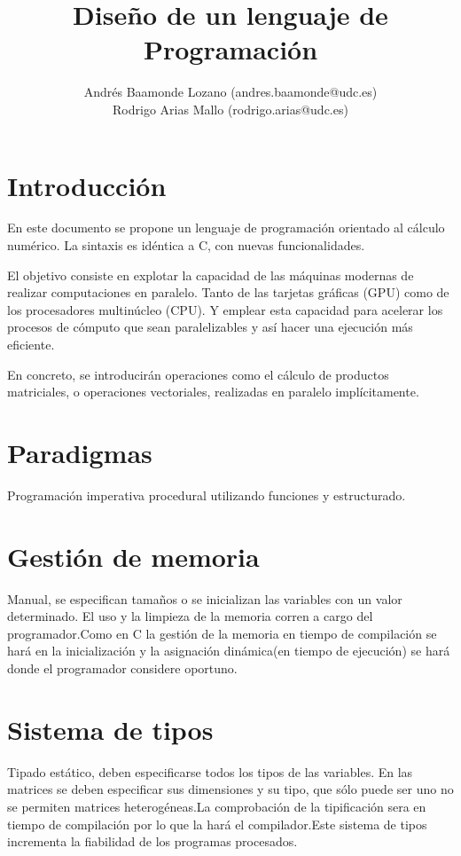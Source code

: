 \documentclass[12pt,a4paper]{article}
\title{Diseño de un lenguaje de Programación}
\author{Andrés Baamonde Lozano (andres.baamonde@udc.es)\\
	Rodrigo Arias Mallo (rodrigo.arias@udc.es)}
\begin{document}
\maketitle

\clearpage 

\tableofcontents

\clearpage 



\section{Introducción}
En este documento se propone un lenguaje de programación orientado al cálculo 
numérico. La sintaxis es idéntica a C, con nuevas funcionalidades.

El objetivo consiste en explotar la capacidad de las máquinas modernas de 
realizar computaciones en paralelo. Tanto de las tarjetas gráficas (GPU) como de 
los procesadores multinúcleo (CPU). Y emplear esta capacidad para acelerar los 
procesos de cómputo que sean paralelizables y así hacer una ejecución más 
eficiente.

En concreto, se introducirán operaciones como el cálculo de productos 
matriciales, o operaciones vectoriales, realizadas en paralelo implícitamente.
\section{Paradigmas}
Programación imperativa procedural utilizando funciones y estructurado.
\section{Gestión de memoria}
Manual, se especifican tamaños o se inicializan las variables con un valor
determinado. El uso y la limpieza de la memoria corren a cargo del programador.Como en C la gestión de la memoria en tiempo de compilación se hará en la inicialización y la asignación dinámica(en tiempo de ejecución) se hará donde el programador considere oportuno.
\section{Sistema de tipos}
Tipado estático, deben especificarse todos los tipos de las variables. En las
matrices se deben especificar sus dimensiones y su tipo, que sólo puede ser uno
no se permiten matrices heterogéneas.La comprobación de la tipificación sera en tiempo de compilación por lo que la hará el compilador.Este sistema de tipos incrementa la fiabilidad de los programas procesados.
\end{document}

